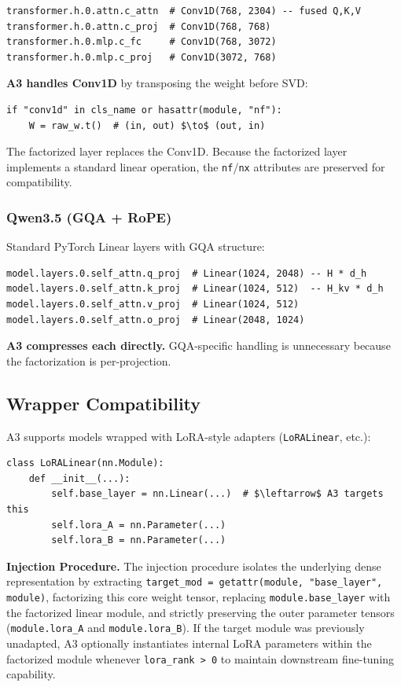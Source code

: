 \begin{lstlisting}
transformer.h.0.attn.c_attn  # Conv1D(768, 2304) -- fused Q,K,V
transformer.h.0.attn.c_proj  # Conv1D(768, 768)
transformer.h.0.mlp.c_fc     # Conv1D(768, 3072)
transformer.h.0.mlp.c_proj   # Conv1D(3072, 768)
\end{lstlisting}

\textbf{A3 handles Conv1D} by transposing the weight before SVD:

\begin{lstlisting}
if "conv1d" in cls_name or hasattr(module, "nf"):
    W = raw_w.t()  # (in, out) $\to$ (out, in)
\end{lstlisting}

The factorized layer replaces the Conv1D. Because the factorized layer 
implements a standard linear operation, the \texttt{nf}/\texttt{nx} attributes are preserved 
for compatibility.

\subsubsection{Qwen3.5 (GQA + RoPE)}

Standard PyTorch Linear layers with GQA structure:

\begin{lstlisting}
model.layers.0.self_attn.q_proj  # Linear(1024, 2048) -- H * d_h
model.layers.0.self_attn.k_proj  # Linear(1024, 512)  -- H_kv * d_h
model.layers.0.self_attn.v_proj  # Linear(1024, 512)
model.layers.0.self_attn.o_proj  # Linear(2048, 1024)
\end{lstlisting}

\textbf{A3 compresses each directly.} GQA-specific handling is unnecessary because 
the factorization is per-projection.

\subsection{Wrapper Compatibility}

A3 supports models wrapped with LoRA-style adapters (\texttt{LoRALinear}, etc.):

\begin{lstlisting}
class LoRALinear(nn.Module):
    def __init__(...):
        self.base_layer = nn.Linear(...)  # $\leftarrow$ A3 targets this
        self.lora_A = nn.Parameter(...)
        self.lora_B = nn.Parameter(...)
\end{lstlisting}

\textbf{Injection Procedure.} The injection procedure isolates the underlying dense representation by extracting \texttt{target\_mod = getattr(module, "base\_layer", module)}, factorizing this core weight tensor, replacing \texttt{module.base\_layer} with the factorized linear module, and strictly preserving the outer parameter tensors (\texttt{module.lora\_A} and \texttt{module.lora\_B}). If the target module was previously unadapted, A3 optionally instantiates internal LoRA parameters within the factorized module whenever \texttt{lora\_rank > 0} to maintain downstream fine-tuning capability.

